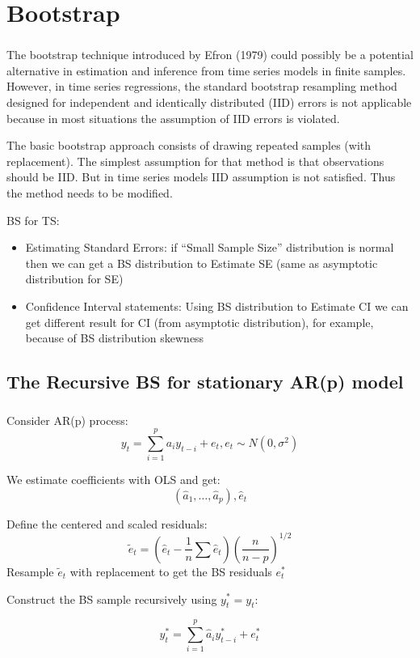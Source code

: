 \documentclass[c, dvipsnames]{beamer}  %
\begin{document}
\section{Bootstrap}




\begin{frame}[shrink=5]
\frametitle{\insertsection} 


The bootstrap technique introduced by Efron (1979) could possibly be a potential alternative in estimation and inference from time series models in finite samples. However, in time series regressions, the standard bootstrap resampling method designed for independent and identically distributed (IID) errors is not applicable because in most situations the assumption of IID errors is violated. 


The basic bootstrap approach consists of drawing repeated samples (with replacement). 
The simplest assumption for that method is that observations should be IID. 
But in time series models IID assumption is not satisfied.
Thus the method needs to be modified.

	\begin{block}{BS for TS:}

\begin{itemize}
	\item Estimating Standard Errors:  if “Small Sample Size” distribution is normal then we can get a BS distribution to Estimate SE (same as asymptotic distribution for SE)
	\item Confidence Interval statements:
	Using BS distribution to Estimate CI we can get  different result for CI (from asymptotic distribution), for example, because of BS distribution skewness 
\end{itemize}

\end{block}

\end{frame}




\subsection{The Recursive BS for stationary AR(p) model}

\begin{frame}[shrink=5]
\frametitle{\insertsection} 
\framesubtitle{\insertsubsection}


Consider AR(p) process:
\[ y_t = \sum_{i=1}^p a_i y_{t-i} + e_t, e_t \sim N(0,\sigma^2)\]

We estimate coefficients with OLS and get: 
\[ (\hat{a}_1,\dots, \hat{a}_p), \hat{e}_t \]




 Define the centered and scaled residuals:
\[ \tilde{e}_t = (\hat{e}_{t} - \frac{1}{n} \sum \hat{e}_{t} )  \left( \frac{n}{n-p}\right) ^{1/2} \]
Resample $ \tilde{e}_t $ with replacement to get the BS residuals $ e_t^* $

Construct the BS sample recursively using $ y_t^* = y_t $:

\[ y_t^* = \sum_{i=1}^p \hat{a}_i y_{t-i}^* + e_t^*\]


\end{frame}
\end{document}
